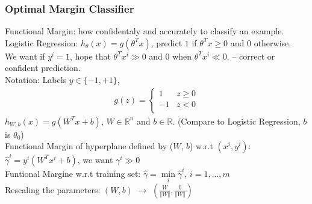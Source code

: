 \documentclass{article}
\begin{document}
\subsubsection{Optimal Margin Classifier}
Functional Margin: how confidentaly and accurately to classify an example.\\
\indent
Logistic Regression: $h_\theta(x) = g(\theta^Tx)$, predict $1$ if $\theta^Tx \geq 0$ and $0$ otherwise.\\
\indent
We want if $y^i=1$, hope that $\theta^Tx^i \gg 0$ and $0$ when $\theta^Tx^i \ll 0$. -- correct or confident prediction.\\

\noindent
Notation: Labels $y \in \{-1, +1\}$, 
\begin{align}
  g(z)=
      \begin{cases}
      1 & z \geq 0 \\
      -1 & z < 0 \\
      \end{cases}
\end{align}
$h_{W,b}(x) = g(W^Tx+b)$, $W \in \mathbb{R}^n$ and $b \in \mathbb{R}$. (Compare to Logistic Regression, $b$ is $\theta_0$)\\

\noindent
Functional Margin of hyperplane defined by ($W$, $b$) w.r.t $(x^i, y^i)$:\\
\indent $\hat{\gamma}^i = y^i(W^Tx^i+b)$, we want $\gamma^i \gg 0$\\
Funtional Margine w.r.t training set: $\hat{\gamma} = \min\limits_{i}\hat{\gamma}^i$, $i = 1, ..., m$\\
Rescaling the parameters: $(W,b)$ $\rightarrow$ $(\frac{W}{\Vert W \Vert}, \frac{b}{\Vert W \Vert})$\\
\end{document}
